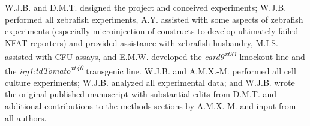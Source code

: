 W.J.B. and D.M.T. designed the project and conceived experiments; W.J.B. performed all zebrafish experiments, A.Y. assisted with some aspects of zebrafish experiments (especially microinjection of constructs to develop ultimately failed NFAT reporters) and provided assistance with zebrafish husbandry, M.I.S. assisted with CFU assays, and E.M.W. developed the \textit{card9\textsuperscript{xt31}} knockout line and the \textit{irg1}:\textit{tdTomato\textsuperscript{xt40}} transgenic line. W.J.B. and A.M.X.-M. performed all cell culture experiments; W.J.B. analyzed all experimental data; and W.J.B. wrote the original published manuscript with substantial edits from D.M.T. and additional contributions to the methods sections by A.M.X.-M. and input from all authors.


